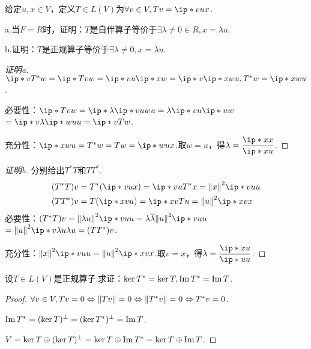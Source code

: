 \begin{problem}[15]\label{7.A.15}
    给定\(u,x \in V\)，定义\(T \in L(V)\)为\(\forall v \in V,Tv=\ip*{v}{u}x\).

    a.当\(F=R\)时，证明：\(T\)是自伴算子等价于\(\exists \lambda \ne 0 \in R,x=\lambda u\).
    
    b.证明：\(T\)是正规算子等价于\(\exists \lambda \ne 0,x=\lambda u\).
\end{problem}

\begin{proof}[证明a]
    \(\ip*{v}{T^*w}=\ip*{Tv}{w}=\ip*{v}{u}\ip*{x}{w}=\ip*{v}{\ip*{x}{w}u},T^*w=\ip*{x}{w}u\).

    必要性：\(\ip*{Tv}{w}=\ip*{\lambda \ip*{v}{u}}{w}u=\lambda \ip*{v}{u} \ip*{u}{w}\)
    \(=\ip*{v}{\lambda \ip*{w}{u}u}=\ip*{v}{Tw}\).
    
    充分性：\(\ip*{x}{w}u=T^*w=Tw=\ip*{w}{u}x\).取\(w=u\)，得\(\lambda=\dfrac{\ip*{x}{x}}{\ip*{x}{u}}\).
\end{proof}

\begin{proof}[证明b]
    分别给出\(T^*T\)和\(TT^*\).
    \begin{align*}
        &(T^*T)v=T^*(\ip*{v}{u}x)=\ip*{v}{u}T^*x=\norm*{x}^2\ip*{v}{u}u \\
        &(TT^*)v=T(\ip*{x}{v}u)=\ip*{x}{v}Tu=\norm*{u}^2\ip*{x}{v}x
    \end{align*}
    必要性：\((T^*T)v=\norm*{\lambda u}^2 \ip*{v}{u}u=\lambda \ol{\lambda} \norm*{u}^2 \ip*{v}{u}u\)
    \(=\norm*{u}^2 \ip*{v}{\lambda u}\lambda u=(TT^*)v\).

    充分性：\(\norm*{x}^2\ip*{v}{u}u=\norm*{u}^2\ip*{x}{v}x\).取\(v=x\)，得\(\lambda=\dfrac{\ip*{x}{u}}{\ip*{u}{u}}\).
\end{proof}

\begin{problem}[16]\label{7.A.16}
    设\(T \in L(V)\)是正规算子.求证：\(\ker T^*=\ker T,\Img T^*=\Img T\).
\end{problem}

\begin{proof}
    \(\forall v \in V,Tv=0 \Leftrightarrow \norm*{Tv}=0 \Leftrightarrow \norm*{T^*v}=0 \Leftrightarrow T^*v=0\).

    \(\Img T^*=(\ker T)^\bot=(\ker T^*)^\bot=\Img T\).

    \(V=\ker T \oplus (\ker T)^\bot=\ker T \oplus \Img T^*=\ker T \oplus \Img T\).
\end{proof}

